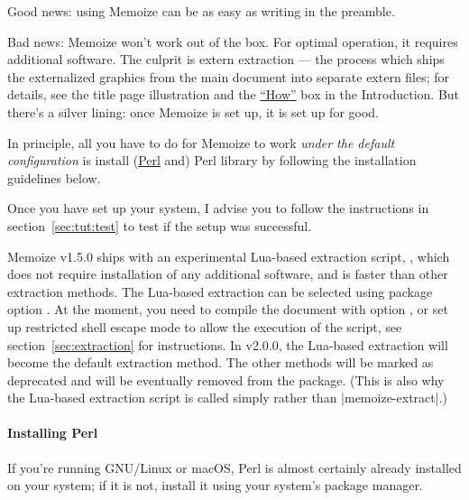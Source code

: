 \documentclass[a4paper,11pt]{article}
\begin{document}
Good news: using Memoize can be as easy as writing
\EmphVerbatim{\usepackage{memoize}} in the preamble.

Bad news: Memoize won't work out of the box.  For optimal operation, it
requires additional software.  The culprit is extern extraction --- the process
which ships the externalized graphics from the main document into separate
extern files; for details, see the title page illustration and the
\hyperlink{How}{``How''} box in the Introduction.  But there's a silver
lining: once Memoize is set up, it is set up for good.

\begin{tcolorbox}[title=What do I have to do?]
  In principle, all you have to do for Memoize to work \emph{under the default
    configuration} is install (\href{https://www.perl.org}{Perl} and) Perl
  library  by following
  the installation guidelines below.
\end{tcolorbox}

Once you have set up your system, I advise you to follow the instructions in
section~\ref{sec:tut:test} to test if the setup was successful.

\begin{tcolorbox}[warning,title=Experimental Lua-based extraction]
  Memoize v1.5.0 ships with an experimental Lua-based extraction script,
  , which does not require installation of any
  additional software, and is faster than other extraction methods.  The
  Lua-based extraction can be selected using package option
  . At the moment, you need to
  compile the document with option , or set up restricted
  shell escape mode to allow the execution of the script, see
  section~\ref{sec:extraction} for instructions.  In v2.0.0, the Lua-based
  extraction will become the default extraction method.  The other methods will
  be marked as deprecated and will be eventually removed from the package.
  (This is also why the Lua-based extraction script is called simply
   rather than |memoize-extract|.)
\end{tcolorbox}

\paragraph{Installing Perl}
If you're running GNU/Linux or macOS, Perl is almost certainly already
installed on your system; if it is not, install it using your system's package
manager.
\end{document}
